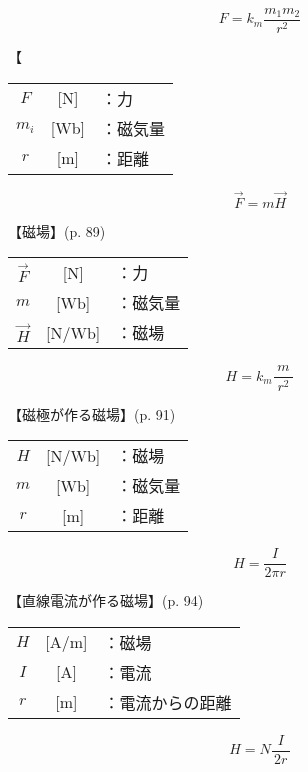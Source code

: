 \documentclass[10pt]{jarticle}
\begin{document}
\newpage
\[
F = k_m \frac{m_1 m_2}{r^2}
\]


\vskip3mm
\noindent
【

\begin{tabular}{ccl}
$F$	&[N]	&：力 \\
$m_i$	&[Wb]	&：磁気量 \\
$r$	&[m]	&：距離
\end{tabular}








\newpage
\[
\vec{F} = m \vec{H}
\]


\vskip3mm
\noindent
【磁場】{\footnotesize (p. 89)}

\begin{tabular}{ccl}
$\vec{F}$	&[N]	&：力 \\
$m$	&[Wb]	&：磁気量 \\
$\vec{H}$	&[N/Wb]	&：磁場
\end{tabular}






\newpage
\[
H = k_m \frac{m}{\; r^2 \;}
\]


\vskip3mm
\noindent
【磁極が作る磁場】{\footnotesize (p. 91)}

\begin{tabular}{ccl}
$H$	&[N/Wb]	&：磁場 \\
$m$	&[Wb]	&：磁気量 \\
$r$	&[m]	&：距離
\end{tabular}





\newpage
\[
H = \frac{I}{2 \pi r}
\]


\vskip3mm
\noindent
【直線電流が作る磁場】{\footnotesize (p. 94)}

\begin{tabular}{ccl}
$H$	&[A/m]	&：磁場 \\
$I$	&[A]	&：電流 \\
$r$	&[m]	&：電流からの距離
\end{tabular}




\newpage
\[
H = N \frac{I}{\, 2 r \,}
\]


\vskip3mm
\noindent
{}
\end{document}
